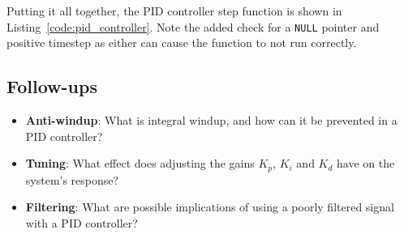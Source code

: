 \documentclass[main.tex]{subfiles}
\begin{document}
\noindent Putting it all together, the PID controller step function is shown in Listing~\ref{code:pid_controller}. Note the added check for a \texttt{NULL} pointer and positive timestep as either can cause the function to not run correctly.



\subsection{Follow-ups}
\begin{itemize}
    \item \textbf{Anti-windup}: What is integral windup, and how can it be prevented in a PID controller?
    \item \textbf{Tuning}: What effect does adjusting the gains $K_p$, $K_i$ and $K_d$ have on the system's response?
    \item \textbf{Filtering}: What are possible implications of using a poorly filtered signal with a PID controller?
\end{itemize}
\end{document}
